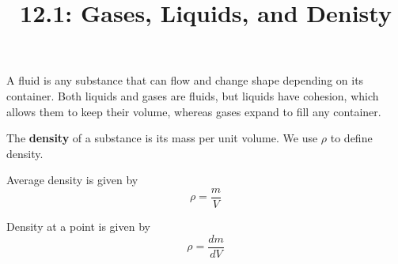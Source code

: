 \documentclass{article}
\title{12.1: Gases, Liquids, and Denisty}
\begin{document}
\maketitle
\begin{definition}[Fluids]
A fluid is any substance that can flow and change shape depending on its container. Both liquids and gases are fluids, but liquids have cohesion, which allows them to keep their volume, whereas gases expand to fill any container.
\end{definition}

\begin{definition}[Density]
The \textbf{density} of a substance is its mass per unit volume. We use $\rho$ to define density.

Average density is given by $$\rho = \frac{m}{V}$$

Density at a point is given by $$\rho = \frac{dm}{dV}$$
\end{definition}
\end{document}
